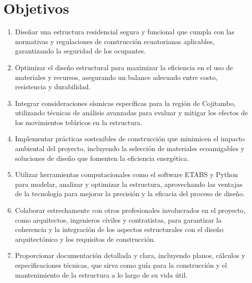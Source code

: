 \documentclass{report}
\begin{document}
\section{Objetivos}
\begin{enumerate}[label = \alph*]
    \item Diseñar una estructura residencial segura y funcional que cumpla con las normativas y regulaciones de construcción ecuatorianas aplicables, garantizando la seguridad de los ocupantes.
    \item Optimizar el diseño estructural para maximizar la eficiencia en el uso de materiales y recursos, asegurando un balance adecuado entre costo, resistencia y durabilidad.
    \item Integrar consideraciones sísmicas específicas para la región de Cojitambo, utilizando técnicas de análisis avanzadas para evaluar y mitigar los efectos de los movimientos telúricos en la estructura.
    \item Implementar prácticas sostenibles de construcción que minimicen el impacto ambiental del proyecto, incluyendo la selección de materiales ecoamigables y soluciones de diseño que fomenten la eficiencia energética.
    \item Utilizar herramientas computacionales como el software ETABS y Python para modelar, analizar y optimizar la estructura, aprovechando las ventajas de la tecnología para mejorar la precisión y la eficacia del proceso de diseño.
    \item Colaborar estrechamente con otros profesionales involucrados en el proyecto, como arquitectos, ingenieros civiles y contratistas, para garantizar la coherencia y la integración de los aspectos estructurales con el diseño arquitectónico y los requisitos de construcción.
    \item Proporcionar documentación detallada y clara, incluyendo planos, cálculos y especificaciones técnicas, que sirva como guía para la construcción y el mantenimiento de la estructura a lo largo de su vida útil.
\end{enumerate}
\end{document}
